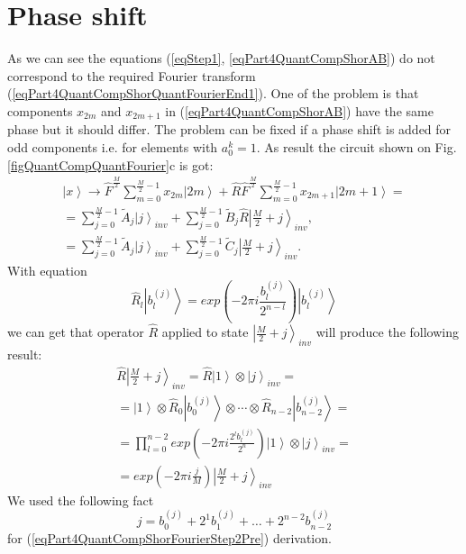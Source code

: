 \documentclass{llncs}
\begin{document}
\section{Phase shift}

As we can see the equations (\ref{eqStep1}, \ref{eqPart4QuantCompShorAB}) do
not correspond to the required Fourier transform
(\ref{eqPart4QuantCompShorQuantFourierEnd1}).
One of the problem is that components $x_{2m}$ and $x_{2m+1}$ in
(\ref{eqPart4QuantCompShorAB}) have the same phase but it should
differ. The problem can be fixed if a phase shift is added for odd
components i.e.  for elements with $a_0^k = 1$. As result the circuit 
shown on Fig. \ref{figQuantCompQuantFourier}c is got: 
\begin{eqnarray}
\left|x\right> \rightarrow
\hat{F}^{\frac{M}{2}} \sum_{m = 0}^{\frac{M}{2} - 1}x_{2m} \left|2m\right> +
\hat{R}\hat{F}^{\frac{M}{2}} \sum_{m = 0}^{\frac{M}{2} - 1} x_{2m + 1}
\left|2m+1\right> =
\nonumber \\
= 
\sum^{\frac{M}{2} - 1}_{j = 0} \tilde{A}_{j} \left|j\right>_{inv} +
\sum^{\frac{M}{2} - 1}_{j = 0}  
\tilde{B}_{j} \hat{R}\left|\frac{M}{2} + j\right>_{inv},
\nonumber \\
= 
\sum^{\frac{M}{2} - 1}_{j = 0}  \tilde{A}_{j} \left|j\right>_{inv} +
\sum^{\frac{M}{2} - 1}_{j = 0}  
\tilde{C}_{j} \left|\frac{M}{2} + j\right>_{inv}.
\label{eqPart4QuantCompShorFourierStep2}
\end{eqnarray}
With equation
\begin{equation}
\hat{R}_l \left|b^{(j)}_l\right> = 
exp{\left(- 2 \pi i \frac{b^{(j)}_l}{2^{n-l}}\right)}
\left|b^{(j)}_l\right>
\nonumber
\end{equation}
we can get that operator $\hat{R}$ applied to state  
$\left|\frac{M}{2} + j\right>_{inv}$ will produce the following result:
\begin{eqnarray}
\hat{R}\left|\frac{M}{2} + j\right>_{inv} = 
\hat{R}\left|1\right> \otimes  \left|j\right>_{inv} = 
\nonumber \\
= 
\left|1\right> \otimes \hat{R}_0 \left|b^{(j)}_0\right>
\otimes \cdots \otimes \hat{R}_{n-2} \left|b^{(j)}_{n-2}\right> = 
\nonumber \\
= 
\prod_{l = 0}^{n-2}exp{\left(- 2 \pi i \frac{2^lb^{(j)}_l}{2^n}\right)}
\left|1\right> \otimes \left|j\right>_{inv} = 
\nonumber \\
=
exp{\left(-2 \pi i \frac{j}{M}\right)}
\left|\frac{M}{2} + j\right>_{inv} 
\label{eqPart4QuantCompShorFourierStep2Pre}
\end{eqnarray}
We used the following fact
\[
j = b^{(j)}_0 + 2^1 b^{(j)}_1 + \dots + 2^{n-2} b^{(j)}_{n-2}
\]
for (\ref{eqPart4QuantCompShorFourierStep2Pre}) derivation.
\end{document}
